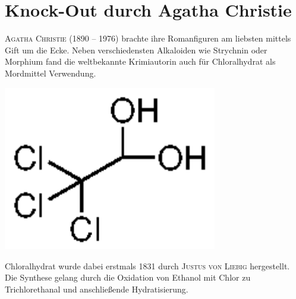 \documentclass[../kl10.tex]{subfiles}
\begin{document}
\section{Knock-Out durch Agatha Christie}
\noindent
\begin{minipage}[H]{0.8\textwidth}
  \textsc{Agatha Christie} (1890 – 1976) brachte ihre Romanfiguren am liebsten mittels Gift um die Ecke. Neben verschiedensten Alkaloiden wie Strychnin oder Morphium fand die weltbekannte Krimiautorin auch für Chloralhydrat als Mordmittel Verwendung. 
\end{minipage}
\hfill
\begin{minipage}[H]{0.19\textwidth}
  \includegraphics[width=0.7\textwidth]{2024/Abbildungen/Hydrat/Chloralhydrat.eps}
\end{minipage}



Chloralhydrat wurde dabei erstmals 1831 durch \textsc{Justus von Liebig} hergestellt. Die Synthese gelang durch die Oxidation von Ethanol mit Chlor zu Trichlorethanal und anschließende Hydratisierung. 

\end{document}
